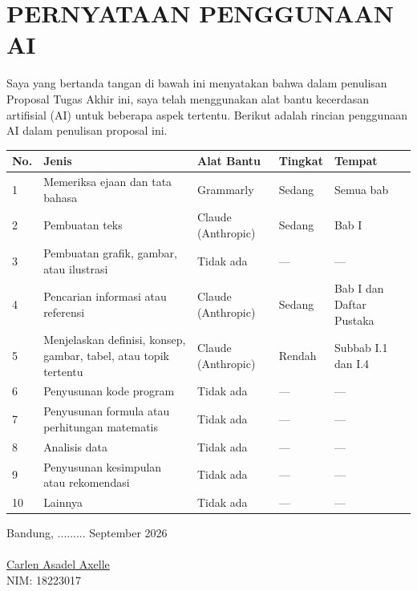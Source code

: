 \chapter*{PERNYATAAN PENGGUNAAN AI}
Saya yang bertanda tangan di bawah ini menyatakan bahwa dalam penulisan Proposal Tugas Akhir ini, saya telah menggunakan alat bantu kecerdasan artifisial (AI) untuk beberapa aspek tertentu. Berikut adalah rincian penggunaan AI dalam penulisan proposal ini.
{\small
\begin{longtable}{|p{0.6cm}|p{3.85cm}|p{2.3cm}|p{1.4cm}|p{3.1cm}|}
\hline
No. & Jenis & Alat Bantu & Tingkat & Tempat \\ \hline
1 & Memeriksa ejaan dan tata bahasa & Grammarly & Sedang & Semua bab \\ \hline
2 & Pembuatan teks & Claude (Anthropic) & Sedang & Bab I \\ \hline
3 & Pembuatan grafik, gambar, atau ilustrasi & Tidak ada & — & — \\ \hline
4 & Pencarian informasi atau referensi & Claude (Anthropic) & Sedang & Bab I dan Daftar Pustaka \\ \hline
5 & Menjelaskan definisi, konsep, gambar, tabel, atau topik tertentu & Claude (Anthropic) & Rendah & Subbab I.1 dan I.4 \\ \hline
6 & Penyusunan kode program & Tidak ada & — & — \\ \hline
7 & Penyusunan formula atau perhitungan matematis & Tidak ada & — & — \\ \hline
8 & Analisis data & Tidak ada & — & — \\ \hline
9 & Penyusunan kesimpulan atau rekomendasi & Tidak ada & — & — \\ \hline
10 & Lainnya & Tidak ada & — & — \\ \hline
\end{longtable}
}


Bandung, ......... September 2026\\
\\[2cm]

\underline{Carlen Asadel Axelle} \\
NIM: 18223017